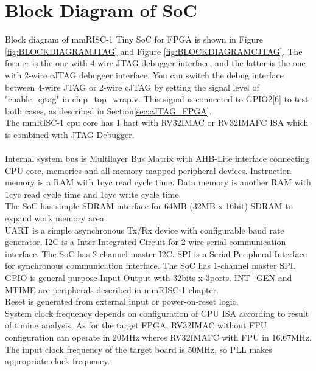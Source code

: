 \section{Block Diagram of SoC}

Block diagram of mmRISC-1 Tiny SoC for FPGA is shown in Figure \ref{fig:BLOCKDIAGRAMJTAG} and Figure \ref{fig:BLOCKDIAGRAMCJTAG}. The former is the one with 4-wire JTAG debugger interface, and the latter is the one with 2-wire cJTAG debugger interface. You can switch the debug interface between 4-wire JTAG or 2-wire cJTAG by setting the signal level of "enable\_cjtag" in chip\_top\_wrap.v. This signal is connected to GPIO2[6] to test both cases, as described in Section\ref{sec:cJTAG_FPGA}.\\

The mmRISC-1 cpu core has 1 hart with RV32IMAC or RV32IMAFC ISA which is combined with JTAG Debugger. \\\\
Internal system bus is Multilayer Bus Matrix with AHB-Lite interface connecting CPU core, memories and all memory mapped peripheral devices. Instruction memory is a RAM with 1cyc read cycle time. Data memory is another RAM with 1cyc read cycle time and 1cyc write cycle time. \\

The SoC has simple SDRAM interface for 64MB (32MB x 16bit) SDRAM to expand work memory area.\\

UART is a simple asynchronous Tx/Rx device with configurable baud rate generator. 
I2C is a Inter Integrated Circuit for 2-wire serial communication interface. The SoC has 2-channel master I2C.
SPI is a Serial Peripheral Interface for synchronous communication interface. The SoC has 1-channel master SPI.
GPIO is general purpose Input Output with 32bits x 3ports. 
INT\_GEN and MTIME are peripherals described in mmRISC-1 chapter.\\

Reset is generated from external input or power-on-reset logic.\\
System clock frequency depends on configuration of CPU ISA according to result of timing analysis. As for the target FPGA, RV32IMAC without FPU configuration can operate in 20MHz wheres RV32IMAFC with FPU in 16.67MHz. The input clock frequency of the target board is 50MHz, so PLL makes appropriate clock frequency. \\

